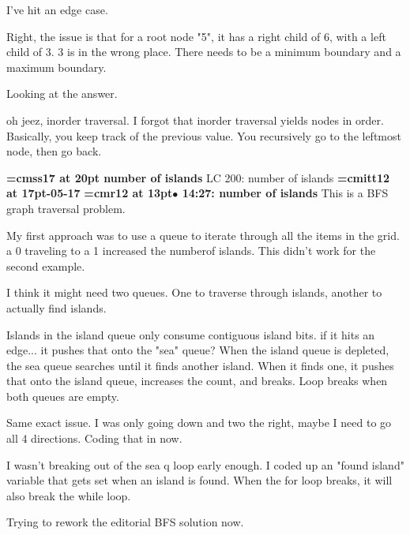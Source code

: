 I've hit an edge case.
\par

Right, the issue is that for a root node "5", it has a right child of 6, with a left child of 3. 3 is in the wrong place. There needs to be a minimum boundary and a maximum boundary.
\par

Looking at the answer.
\par

oh jeez, inorder traversal. I forgot that inorder traversal yields nodes in order. Basically, you keep track of the previous value. You recursively go to the leftmost node, then go back.
\par

{\medskip\noindent\bf\font\titlefont=cmss17 at 20pt number of islands}\medskip
LC 200: number of islands
{\medskip\noindent\bf\font\titlefont=cmitt12 at 17pt-05-17}\medskip
{\smallskip\noindent\bf\font\titlefont=cmr12 at 13pt\titlefont $\bullet$ 14:27: number of islands}\smallskip
This is a BFS graph traversal problem.
\par

My first approach was to use a queue to iterate through all the items in the grid. a 0 traveling to a 1 increased the numberof islands. This didn't work for the second example.
\par

I think it might need two queues. One to traverse through islands, another to actually find islands.
\par

Islands in the island queue only consume contiguous island bits. if it hits an edge... it pushes that onto the "sea" queue? When the island queue is depleted, the sea queue searches until it finds another island. When it finds one, it pushes that onto the island queue, increases the count, and breaks. Loop breaks when both queues are empty.
\par

Same exact issue. I was only going down and two the right, maybe I need to go all 4 directions. Coding that in now.
\par

I wasn't breaking out of the sea q loop early enough. I coded up an "found island" variable that gets set when an island is found. When the for loop breaks, it will also break the while loop.
\par

Trying to rework the editorial BFS solution now.
\par

